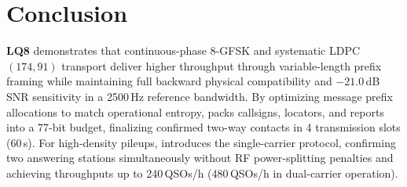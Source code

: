 %
%
%
%
%
%


\section{Conclusion}
\label{sec:conclusion}

\textbf{LQ8} demonstrates that continuous-phase 8-GFSK and systematic LDPC$(174,91)$ transport deliver higher throughput through variable-length prefix framing while maintaining full backward physical compatibility and $-21.0$\,dB SNR sensitivity in a 2500\,Hz reference bandwidth. By optimizing message prefix allocations to match operational entropy,  packs callsigns, locators, and reports into a 77-bit budget, finalizing confirmed two-way contacts in 4 transmission slots (60\,s). For high-density pileups,  introduces the single-carrier  protocol, confirming two answering stations simultaneously without RF power-splitting penalties and achieving throughputs up to 240\,QSOs/h (480\,QSOs/h in dual-carrier operation).

